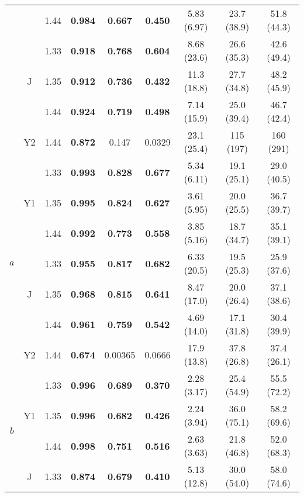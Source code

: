 \begin{table}[htb!]
\begin{tabular}{|ccc|ccc|ccc|}
        & & 1.44 & \textbf{0.984} & \textbf{0.667} & \textbf{0.450} & 5.83 (6.97) & 23.7 (38.9) & 51.8 (44.3)\\
        \cline{2-9}
        & \multirow{3}{*}{J} & 1.33 & \textbf{0.918} & \textbf{0.768} & \textbf{0.604} & 8.68 (23.6) & 26.6 (35.3) & 42.6 (49.4) \\
        & & 1.35 & \textbf{0.912} & \textbf{0.736} & \textbf{0.432} & 11.3 (18.8) & 27.7 (34.8) & 48.2 (45.9) \\
        & & 1.44 & \textbf{0.924} & \textbf{0.719} & \textbf{0.498} & 7.14 (15.9) & 25.0 (39.4) & 46.7 (42.4) \\
        \cline{2-9}
        & Y2 & 1.44 & \textbf{0.872} & 0.147 & 0.0329 & 23.1 (25.4) & 115 (197) & 160 (291) \\
        \hline
        \multirow{7}{*}{$a$} & \multirow{3}{*}{Y1} & 1.33 & \textbf{0.993} & \textbf{0.828} & \textbf{0.677} & 5.34 (6.11) & 19.1 (25.1) & 29.0 (40.5) \\
        & & 1.35 & \textbf{0.995} & \textbf{0.824} & \textbf{0.627} & 3.61 (5.95) & 20.0 (25.5) & 36.7 (39.7) \\
        & & 1.44 & \textbf{0.992} & \textbf{0.773} & \textbf{0.558} & 3.85 (5.16) & 18.7 (34.7) & 35.1 (39.1) \\
        \cline{2-9}
        & \multirow{3}{*}{J} & 1.33 & \textbf{0.955} & \textbf{0.817} & \textbf{0.682} & 6.33 (20.5) & 19.5 (25.3) & 25.9 (37.6) \\
        & & 1.35 & \textbf{0.968} & \textbf{0.815} & \textbf{0.641} & 8.47 (17.0) & 20.0 (26.4) & 37.1 (38.6) \\
        & & 1.44 & \textbf{0.961} & \textbf{0.759} & \textbf{0.542} & 4.69 (14.0) & 17.1 (31.8) & 30.4 (39.9) \\
        \cline{2-9}
        & Y2 & 1.44 & \textbf{0.674} & 0.00365 & 0.0666 & 17.9 (13.8) & 37.8 (26.8) & 37.4 (26.1) \\
        \hline
        \multirow{9}{*}{$b$} & \multirow{3}{*}{Y1} & 1.33 & \textbf{0.996} & \textbf{0.689} & \textbf{0.370} & 2.28 (3.17) & 25.4 (54.9) & 55.5 (72.2) \\
        & & 1.35 & \textbf{0.996} & \textbf{0.682} & \textbf{0.426} & 2.24 (3.94) & 36.0 (75.1) & 58.2 (69.6) \\
        & & 1.44 & \textbf{0.998} & \textbf{0.751} & \textbf{0.516} & 2.63 (3.63) & 21.8 (46.8) & 52.0 (68.3) \\
        \cline{2-9}
        & \multirow{3}{*}{J} & 1.33 & \textbf{0.874} & \textbf{0.679} & \textbf{0.410} & 5.13 (12.8) & 30.0 (54.0) & 58.0 (74.6) \\

\end{tabular}
\end{table}
